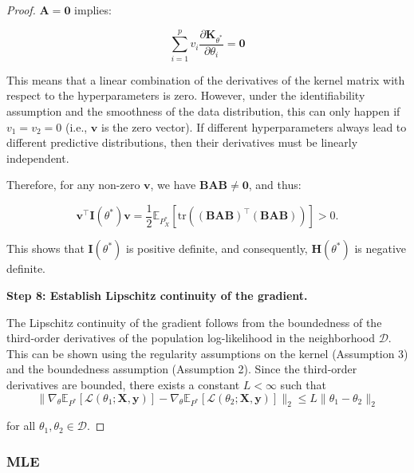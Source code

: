 \begin{proof}
$\mathbf{A} = \mathbf{0}$ implies:

$$
\sum_{i=1}^p v_i \frac{\partial \mathbf{K}_{\theta^*}}{\partial \theta_i}=\mathbf{0}
$$


This means that a linear combination of the derivatives of the kernel matrix with respect to the hyperparameters is zero. However, under the identifiability assumption and the smoothness of the data distribution, this can only happen if $v_1 = v_2 = 0$ (i.e., $\mathbf{v}$ is the zero vector). If different hyperparameters always lead to different predictive distributions, then their derivatives must be linearly independent.

Therefore, for any non-zero $\mathbf{v}$, we have $\mathbf{B}\mathbf{A}\mathbf{B} \neq \mathbf{0}$, and thus:

$$
\mathbf{v}^\top \mathbf{I}(\theta^*) \mathbf{v} = \frac{1}{2} \mathbb{E}_{P^*_X}\left[ \text{tr}\left( (\mathbf{B} \mathbf{A} \mathbf{B})^\top (\mathbf{B} \mathbf{A} \mathbf{B}) \right) \right] > 0.
$$

This shows that $\mathbf{I}(\theta^*)$ is positive definite, and consequently, $\mathbf{H}(\theta^*)$ is negative definite.

\textbf{Step 8: Establish Lipschitz continuity of the gradient.}

The Lipschitz continuity of the gradient follows from the boundedness of the third-order derivatives of the population log-likelihood in the neighborhood $\mathcal{D}$. This can be shown using the regularity assumptions on the kernel (Assumption 3) and the boundedness assumption (Assumption 2). Since the third-order derivatives are bounded, there exists a constant $L < \infty$ such that
\[
\| \nabla_\theta \mathbb{E}_{P^*}[\mathcal{L}(\theta_1; \mathbf{X}, \mathbf{y})] - \nabla_\theta \mathbb{E}_{P^*}[\mathcal{L}(\theta_2; \mathbf{X}, \mathbf{y})] \|_2 \leq L \| \theta_1 - \theta_2 \|_2
\]

for all $\theta_1, \theta_2 \in \mathcal{D}$.

\end{proof}


\subsubsection{MLE}

